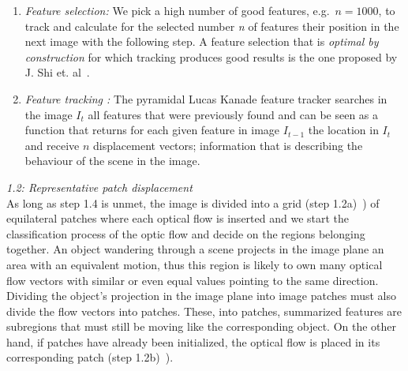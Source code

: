 \documentclass[conference]{IEEEtran}
\begin{document}
\begin{enumerate}
	\item \textit{Feature selection: } We pick a high number of good features, e.g.\ $n=1000$, to track and calculate for the selected number \textit{n} of features their position in the next image with the following step. A feature selection that is \textit{optimal by construction} for which tracking produces good results %
	is the one proposed by J. Shi et. al\ \cite{GFT94-06}. %
	\item \textit{Feature tracking :} The pyramidal Lucas Kanade feature tracker searches in the image $I_t$ all features that were previously found \cite{PILKFT99} %
	and can be seen as a function that returns for each given feature in image $I_{t-1}$ the location in $I_{t}$ and receive $n$ displacement vectors; information that is describing the behaviour of the scene in the image.%
\end{enumerate}
%
\textit{1.2: Representative patch displacement} \\ \newline
As long as step 1.4 is unmet, the image is divided into a grid (step 1.2a)\ ) of equilateral patches where each optical flow is inserted and we start the classification process of the optic flow and decide on the regions belonging together. An object wandering through a scene projects in the image plane an area with an equivalent motion, thus this region is likely to own many optical flow vectors with similar or even equal values pointing to the same direction. Dividing the object's projection in the image plane into image patches must also divide the flow vectors into patches. These, into patches, summarized features are subregions that must still be moving like the corresponding object. \newline
On the other hand, if patches have already been initialized, the optical flow is placed in its corresponding patch (step 1.2b)\ ). \newline
%
\end{document}
